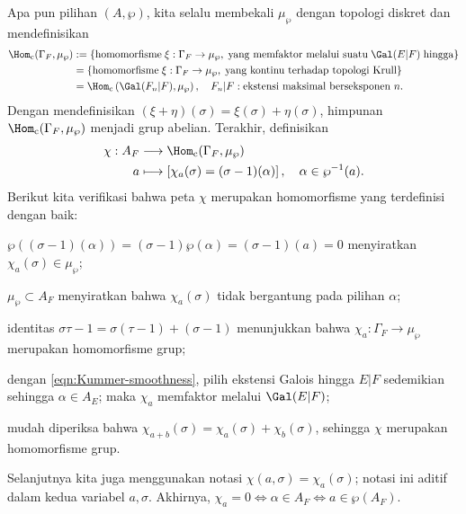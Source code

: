 Apa pun pilihan $(A, \wp)$, kita selalu membekali $\mu_\wp$ dengan topologi diskret dan mendefinisikan
\begin{equation}\label{eqn:Hom_c-Gamma_F}\begin{aligned}
	\Hom_{\text{c}}(\Gamma_F, \mu_\wp) & := \left\{ \text{homomorfisme}\; \xi: \Gamma_F \to \mu_\wp, \; \text{yang memfaktor melalui suatu}\; \Gal(E|F)\; \text{hingga}  \right\} \\
	& = \left\{\text{homomorfisme}\; \xi: \Gamma_F \to \mu_\wp, \; \text{yang kontinu terhadap topologi Krull} \right\} \\
	& = \Hom_{\text{c}}\left(\Gal(F_n|F), \mu_\wp \right), \quad F_n|F: \text{ekstensi maksimal berseksponen $n$}.
\end{aligned}\end{equation}
Dengan mendefinisikan $(\xi + \eta)(\sigma) = \xi(\sigma)+\eta(\sigma)$, himpunan $\Hom_{\text{c}}(\Gamma_F, \mu_\wp)$ menjadi grup abelian. Terakhir, definisikan
\begin{align*}
	\chi: A_F & \longrightarrow \Hom_{\text{c}}(\Gamma_F, \mu_\wp) \\
		a & \longmapsto \left[ \chi_a(\sigma) = (\sigma-1)(\alpha) \right], \quad \alpha \in \wp^{-1}(a).
\end{align*}
Berikut kita verifikasi bahwa peta $\chi$ merupakan homomorfisme yang terdefinisi dengan baik:
\begin{compactitem}
	\item $\wp((\sigma-1)(\alpha)) = (\sigma-1) \wp(\alpha) = (\sigma-1)(a) = 0$ menyiratkan $\chi_a(\sigma) \in \mu_\wp$;
	\item $\mu_\wp \subset A_F$ menyiratkan bahwa $\chi_a(\sigma)$ tidak bergantung pada pilihan $\alpha$;
	\item identitas $\sigma\tau-1 = \sigma(\tau-1) + (\sigma-1)$ menunjukkan bahwa $\chi_a: \Gamma_F \to \mu_\wp$ merupakan homomorfisme grup;
	\item dengan \eqref{eqn:Kummer-smoothness}, pilih ekstensi Galois hingga $E|F$ sedemikian sehingga $\alpha \in A_E$; maka $\chi_a$ memfaktor melalui $\Gal(E|F)$;
	\item mudah diperiksa bahwa $\chi_{a+b}(\sigma) = \chi_a(\sigma) + \chi_b(\sigma)$, sehingga $\chi$ merupakan homomorfisme grup.
\end{compactitem}
Selanjutnya kita juga menggunakan notasi $\chi(a, \sigma) = \chi_a(\sigma)$; notasi ini aditif dalam kedua variabel $a, \sigma$. Akhirnya, $\chi_a = 0 \iff \alpha \in A_F \iff a \in \wp(A_F)$.

